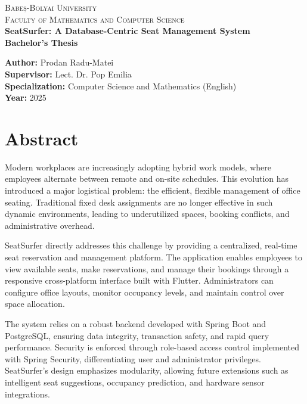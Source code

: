 \documentclass[12pt,a4paper]{report}
\begin{document}
\begin{titlepage}
    \centering
    \textsc{\LARGE Babeș-Bolyai University}\\[0.5cm]
    \textsc{\Large Faculty of Mathematics and Computer Science}\\[1.5cm]
    {\huge\bfseries SeatSurfer: A Database-Centric Seat Management System\\[0.4cm]}
    \vspace{1.5cm}
    \Large
    \textbf{Bachelor’s Thesis}\\[0.5cm]
    \begin{flushleft}
        \textbf{Author:} Prodan Radu-Matei\\
        \textbf{Supervisor:} Lect. Dr. Pop Emilia \\
        \textbf{Specialization:} Computer Science and Mathematics (English) \\
        \textbf{Year:} 2025
    \end{flushleft}
    \vfill
\end{titlepage}

\chapter*{Abstract}

Modern workplaces are increasingly adopting hybrid work models, where employees alternate between remote and on-site schedules. This evolution has introduced a major logistical problem: the efficient, flexible management of office seating. Traditional fixed desk assignments are no longer effective in such dynamic environments, leading to underutilized spaces, booking conflicts, and administrative overhead.

SeatSurfer directly addresses this challenge by providing a centralized, real-time seat reservation and management platform. The application enables employees to view available seats, make reservations, and manage their bookings through a responsive cross-platform interface built with Flutter. Administrators can configure office layouts, monitor occupancy levels, and maintain control over space allocation.

The system relies on a robust backend developed with Spring Boot and PostgreSQL, ensuring data integrity, transaction safety, and rapid query performance. Security is enforced through role-based access control implemented with Spring Security, differentiating user and administrator privileges. SeatSurfer's design emphasizes modularity, allowing future extensions such as intelligent seat suggestions, occupancy prediction, and hardware sensor integrations.
\end{document}
